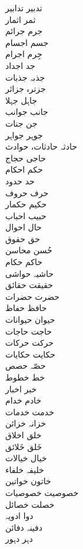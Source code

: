 \documentclass[a4paper]{article}
\begin{document}
\begin{multicols}{3}
\begin{tabbing}
تدبیر \> تدابیر\\
ثمر \> اثمار\\
جرم \> جرائم\\
جسم \> اجسام\\
جِرم \> اجرام\\
جد \> اجداد\\
جذبہ \> جذبات\\
جزترہ \> جزائر\\
جاہل \> جہلا\\
جانب \> جوانب\\
جن \> جنات\\
جوہر \> جواہر\\
حادثہ \> حادثات، حوادث\\
حاجی \> حجاج\\
حکم \> احکام\\
حد \> حدود\\
حرف \> حروف\\
حکیم \> حکمار\\
حبیب \> احباب\\
حال \> احوال\\
حق \> حقوق\\
حُسن \> محاسن\\
حاکم \> حکام\\
حاشیہ \> حواشی\\
حقیقت \> حقائق\\
حضرت \> حضرات\\
حافظ \> حفاظ\\
حیوان \> حیوانات\\
حاجت \> حاجات\\
حرکت \> حرکات\\
حکایت \> حکایات\\
حصّہ \> حصص\\
خط \> خطوط\\
خبر \> اخبار\\
خادم \> خدام\\
خدمت \> خدمات\\
خزانہ \> خزائن\\
خلق \> اخلاق\\
خَلق \> خَلائق\\
خیال \> خیالات\\
خلیفہ \> خلفاء\\
خاتون \> خواتین\\
خصوصیت \> خصوصیات\\
خصلت \> خصائل\\
دوا \> ادویہ\\
دفینہ \> دفائن\\
دہر \> دہور\\

\end{tabbing}
\end{multicols}
\end{document}
